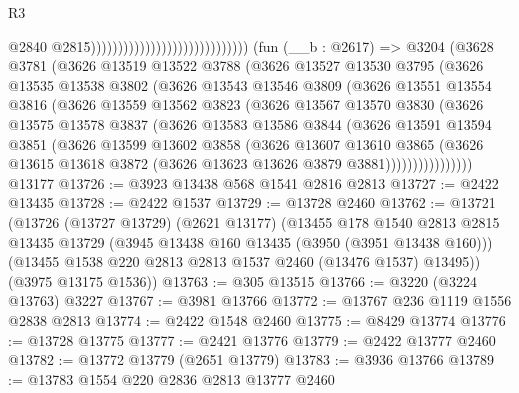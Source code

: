 \begin{lexlean}{R3}
\begin{coremodule}
                                                              @2840
                                                              @2815)))))))))))))))))))))))))))))
    (fun (__b : @2617) =>
    @3204
      (@3628
        @3781
        (@3626
          @13519
          @13522
          @3788
          (@3626
            @13527
            @13530
            @3795
            (@3626
              @13535
              @13538
              @3802
              (@3626
                @13543
                @13546
                @3809
                (@3626
                  @13551
                  @13554
                  @3816
                  (@3626
                    @13559
                    @13562
                    @3823
                    (@3626
                      @13567
                      @13570
                      @3830
                      (@3626
                        @13575
                        @13578
                        @3837
                        (@3626
                          @13583
                          @13586
                          @3844
                          (@3626
                            @13591
                            @13594
                            @3851
                            (@3626
                              @13599
                              @13602
                              @3858
                              (@3626
                                @13607
                                @13610
                                @3865
                                (@3626
                                  @13615
                                  @13618
                                  @3872
                                  (@3626 @13623 @13626 @3879 @3881))))))))))))))))
    @13177
@13726 := @3923 @13438 @568 @1541 @2816 @2813
@13727 := @2422 @13435
@13728 := @2422 @1537
@13729 := @13728 @2460
@13762 := @13721
    (@13726
      (@13727 @13729)
      (@2621 @13177)
      (@13455
        @178
        @1540
        @2813
        @2815
        @13435
        @13729
        (@3945 @13438 @160 @13435 (@3950 (@3951 @13438 @160)))
        (@13455 @1538 @220 @2813 @2813 @1537 @2460 (@13476 @1537) @13495))
      (@3975 @13175 @1536))
@13763 := @305 @13515
@13766 := @3220 (@3224 @13763) @3227
@13767 := @3981 @13766
@13772 := @13767 @236 @1119 @1556 @2838 @2813
@13774 := @2422 @1548 @2460
@13775 := @8429 @13774
@13776 := @13728 @13775
@13777 := @2421 @13776
@13779 := @2422 @13777 @2460
@13782 := @13772 @13779 (@2651 @13779)
@13783 := @3936 @13766
@13789 := @13783 @1554 @220 @2836 @2813 @13777 @2460

\end{coremodule}
\end{lexlean}
